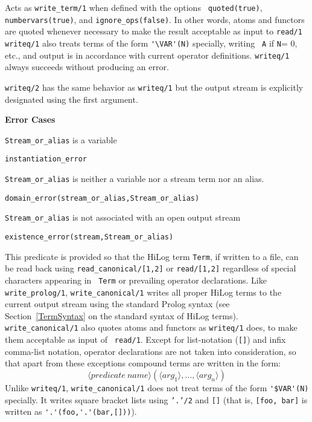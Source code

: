 \begin{description}
%
Acts as {\tt write\_term/1} when defined with the options {\tt
  quoted(true)}, {\tt numbervars(true)}, and {\tt ignore\_ops(false)}.
In other words, atoms and functors are quoted whenever necessary to
make the result acceptable as input to {\tt read/1} {\tt writeq/1}
also treats terms of the form \verb|'\VAR'(N)| specially, writing {\tt
  A} if {\tt N}= 0, etc., and output is in accordance with current
operator definitions.  {\tt writeq/1} always succeeds without
producing an error.

%
	{\tt writeq/2} has the same behavior as {\tt writeq/1} but the
	output stream is explicitly designated using the first argument.

{\bf Error Cases} 
\bi
\item 	{\tt Stream\_or\_alias} is a variable
\bi
\item {\tt instantiation\_error}
\ei
\item 	{\tt Stream\_or\_alias} is neither a variable nor a stream term nor an alias.
\bi
\item 	{\tt domain\_error(stream\_or\_alias,Stream\_or\_alias)}
\ei
\item 	{\tt Stream\_or\_alias} is not associated with an open output stream
\bi
\item 	{\tt existence\_error(stream,Stream\_or\_alias)}
\ei
\ei

%
This predicate is provided so that the HiLog term {\tt Term}, if
written to a file, can be read back using {\tt read\_canonical/[1,2]}
or {\tt read/[1,2]} regardless of special characters appearing in {\tt
  Term} or prevailing operator declarations. Like {\tt
  write\_prolog/1}, {\tt write\_canonical/1} writes all proper HiLog
terms to the current output stream using the standard Prolog syntax
(see Section~\ref{TermSyntax} on the standard syntax of HiLog
terms). {\tt write\_canonical/1} also quotes atoms and functors as
{\tt writeq/1} does, to make them acceptable as input of {\tt
  read/1}\@.  Except for list-notation ({\tt []}) and infix comma-list
notation, operator declarations are not taken into consideration, so
that apart from these exceptions compound terms are written in the
form:
%
		\[ \langle predicate\ name \rangle
			(\langle arg_1 \rangle, \ldots,
			 \langle arg_n \rangle) \]
%
Unlike {\tt writeq/1}, {\tt write\_canonical/1} does not treat terms
of the form \verb|'$VAR'(N)| specially. It writes square bracket lists  %
using {\tt '.'/2} and {\tt []} (that is, {\tt [foo, bar]} is written
as \verb|'.'(foo,'.'(bar,[]))|).


\end{description}
